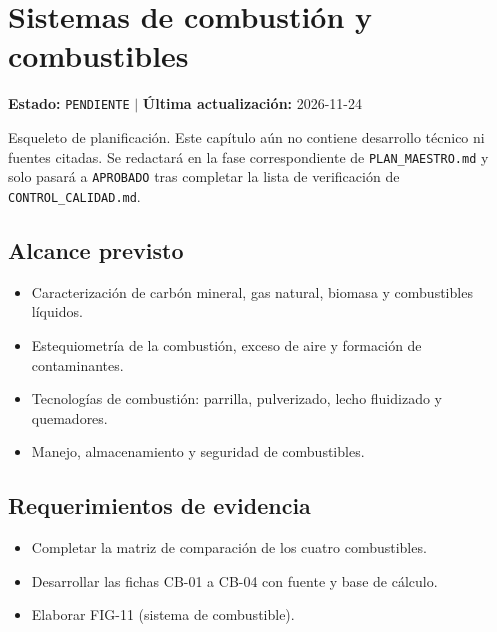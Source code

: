 \chapter{Sistemas de combustión y combustibles}
\label{cap:04}

\begin{cajaestado}
\textbf{Estado:} \texttt{PENDIENTE} \quad$|$\quad
\textbf{Última actualización:} 2026-11-24

Esqueleto de planificación. Este capítulo aún no contiene desarrollo técnico ni
fuentes citadas. Se redactará en la fase correspondiente de
\texttt{PLAN\_MAESTRO.md} y solo pasará a \texttt{APROBADO} tras completar
la lista de verificación de \texttt{CONTROL\_CALIDAD.md}.
\end{cajaestado}

\section{Alcance previsto}
\begin{itemize}
  \item Caracterización de carbón mineral, gas natural, biomasa y combustibles líquidos.
  \item Estequiometría de la combustión, exceso de aire y formación de contaminantes.
  \item Tecnologías de combustión: parrilla, pulverizado, lecho fluidizado y quemadores.
  \item Manejo, almacenamiento y seguridad de combustibles.
\end{itemize}

\section{Requerimientos de evidencia}
\begin{itemize}
  \item Completar la matriz de comparación de los cuatro combustibles.
  \item Desarrollar las fichas CB-01 a CB-04 con fuente y base de cálculo.
  \item Elaborar FIG-11 (sistema de combustible).
\end{itemize}
